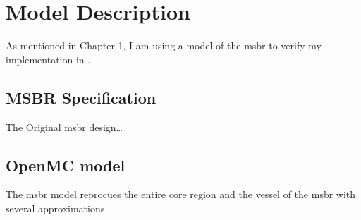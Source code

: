 \chapter{Model Description}
\label{ch:chapter4}
As mentioned in Chapter 1, I am using a model of the \Gls{msbr}
\cite{robertson_conceptual_1971} to verify my \OpenMC implementation in
\SaltProc.

\section{MSBR Specification}
\label{sec:msbr_spec}

The Original \Gls{msbr} design\ldots

\section{OpenMC model}
\label{sec:openmc_model}

The \OpenMC \Gls{msbr} model reprocues the entire core region and the vessel
of the \Gls{msbr} with several approximations.
